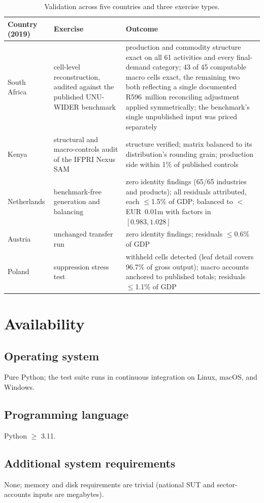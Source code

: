 \documentclass[11pt,a4paper]{article}
\begin{document}
\begin{table}[t]
\centering\small
\begin{tabularx}{\textwidth}{lXX}
\toprule
Country (2019) & Exercise & Outcome \\
\midrule
South Africa & cell-level reconstruction, audited against the published
UNU-WIDER benchmark & production and commodity structure exact on all 61
activities and every final-demand category; 43 of 45 computable macro
cells exact, the remaining two both reflecting a single documented
R596~million reconciling adjustment applied symmetrically; the benchmark's
single unpublished input was priced separately \\
Kenya & structural and macro-controls audit of the IFPRI Nexus SAM &
structure verified; matrix balanced to its distribution's rounding
grain; production side within 1\% of published controls \\
Netherlands & benchmark-free generation and balancing & zero identity
findings (65/65 industries and products); all residuals attributed,
each $\leq$1.5\% of GDP; balanced to $<$EUR~0.01m with factors in
$[0.983, 1.028]$ \\
Austria & unchanged transfer run & zero identity findings; residuals
$\leq$0.6\% of GDP \\
Poland & suppression stress test & withheld cells detected (leaf detail
covers 96.7\% of gross output); macro accounts anchored to published
totals; residuals $\leq$1.1\% of GDP \\
\bottomrule
\end{tabularx}
\caption{Validation across five countries and three exercise types.}
\label{tab:validation}
\end{table}

\section{Availability}

\subsection{Operating system}
Pure Python; the test suite runs in continuous integration on Linux,
macOS, and Windows.

\subsection{Programming language}
Python $\geq$ 3.11.

\subsection{Additional system requirements}
None; memory and disk requirements are trivial (national SUT and
sector-accounts inputs are megabytes).
\end{document}
